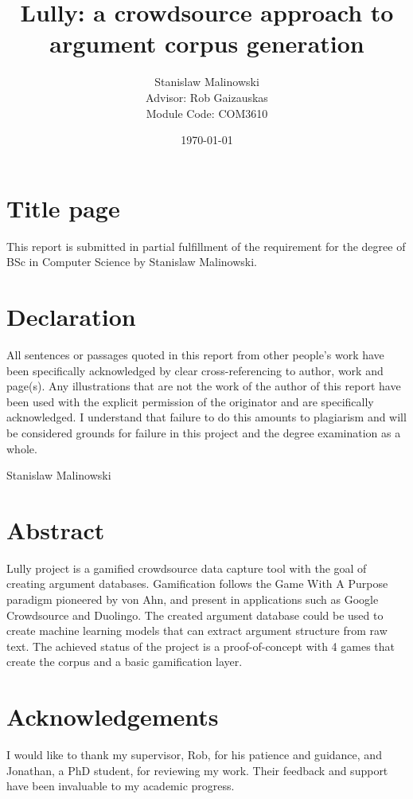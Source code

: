 \documentclass{report}
\title{Lully: a crowdsource approach to argument corpus generation}
\author{Stanislaw Malinowski
\\[1cm]{\small Advisor: Rob Gaizauskas}
\\[1cm]{\small Module Code: COM3610}
}
\date{\today}
\begin{document}
\maketitle
\section*{Title page}
This report is submitted in partial fulfillment of the requirement for the degree of BSc in Computer Science by Stanislaw Malinowski.
\newpage

\section*{Declaration}
All sentences or passages quoted in this report from other people's work have been specifically acknowledged by clear cross-referencing to author, work and page(s). Any illustrations that are not the work of the author of this report have been used with the explicit permission of the originator and are specifically acknowledged. I understand that failure to do this amounts to plagiarism and will be considered grounds for failure in this project and the degree examination as a whole.

Stanislaw Malinowski
\newpage

\section*{Abstract}

Lully project is a gamified crowdsource data capture tool with the goal of creating argument databases. Gamification follows the Game With A Purpose paradigm pioneered by von Ahn, and present in applications such as Google Crowdsource and Duolingo. The created argument database could be used to create machine learning models that can extract argument structure from raw text.
The achieved status of the project is a proof-of-concept with 4 games that create the corpus and a basic gamification layer. 

\newpage

\section*{Acknowledgements}
I would like to thank my supervisor, Rob, for his patience and guidance, and Jonathan, a PhD student, for reviewing my work. Their feedback and support have been invaluable to my academic progress.

\newpage
\end{document}
